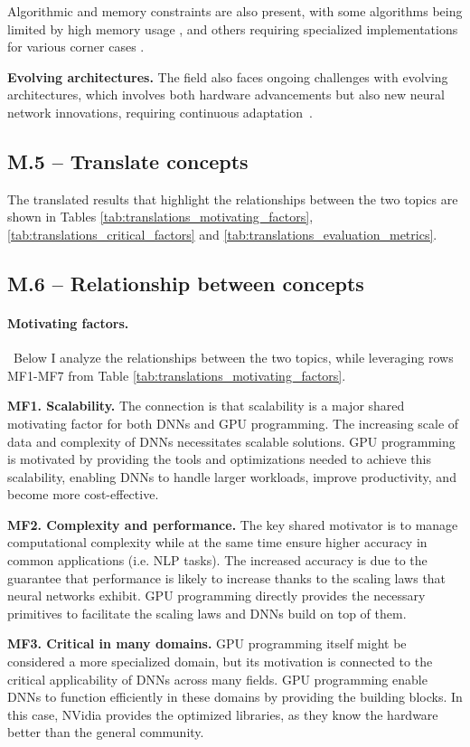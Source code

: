 Algorithmic and memory constraints are also present, with some algorithms being limited by high
memory usage , and others requiring specialized implementations for various corner
cases .

\textbf{Evolving architectures.}
The field also faces ongoing challenges with evolving architectures, which involves both hardware advancements
but also new neural network innovations, requiring continuous adaptation~.

\subsection{M.5 -- Translate concepts}
The translated results that highlight the relationships between the two topics are shown in Tables
\ref{tab:translations_motivating_factors}, \ref{tab:translations_critical_factors} and
\ref{tab:translations_evaluation_metrics}.

\subsection{M.6 -- Relationship between concepts}

\paragraph{Motivating factors.}\
Below I analyze the relationships between the two topics, while leveraging rows MF1-MF7 from Table
\ref{tab:translations_motivating_factors}.

\textbf{MF1. Scalability.}
The connection is that scalability is a major shared motivating factor for both DNNs and GPU programming.
The increasing scale of data and complexity of DNNs necessitates scalable solutions. GPU programming is
motivated by providing the tools and optimizations needed to achieve this scalability, enabling DNNs to
handle larger workloads, improve productivity, and become more cost-effective.

\textbf{MF2. Complexity and performance.}
The key shared motivator is to manage computational complexity while at the same time ensure higher accuracy
in common applications (i.e. NLP tasks). The increased accuracy is due to the guarantee that performance
is likely to increase thanks to the scaling laws that neural networks exhibit.
GPU programming directly provides the necessary primitives to facilitate the scaling laws and DNNs build on top of them.

\textbf{MF3. Critical in many domains.}
GPU programming itself might be considered a more specialized domain, but its motivation is connected to the
critical applicability of DNNs across many fields. GPU programming enable DNNs to function efficiently in
these domains by providing the building blocks. In this case, NVidia provides the optimized libraries, as
they know the hardware better than the general community.

